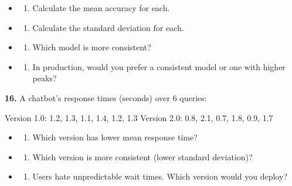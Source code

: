 \documentclass[
  11pt,
]{article}
\providecommand{\tightlist}{%
  \setlength{\itemsep}{0pt}\setlength{\parskip}{0pt}}
\begin{document}
\begin{itemize}
\item
  \begin{enumerate}
  \def\labelenumi{(\alph{enumi})}
  \tightlist
  \item
    Calculate the mean accuracy for each.
  \end{enumerate}
\item
  \begin{enumerate}
  \def\labelenumi{(\alph{enumi})}
  \setcounter{enumi}{1}
  \tightlist
  \item
    Calculate the standard deviation for each.
  \end{enumerate}
\item
  \begin{enumerate}
  \def\labelenumi{(\alph{enumi})}
  \setcounter{enumi}{2}
  \tightlist
  \item
    Which model is more consistent?
  \end{enumerate}
\item
  \begin{enumerate}
  \def\labelenumi{(\alph{enumi})}
  \setcounter{enumi}{3}
  \tightlist
  \item
    In production, would you prefer a consistent model or one with
    higher peaks?
  \end{enumerate}
\end{itemize}

\textbf{16.} A chatbot's response times (seconds) over 6 queries:

Version 1.0: 1.2, 1.3, 1.1, 1.4, 1.2, 1.3 Version 2.0: 0.8, 2.1, 0.7,
1.8, 0.9, 1.7

\begin{itemize}
\item
  \begin{enumerate}
  \def\labelenumi{(\alph{enumi})}
  \tightlist
  \item
    Which version has lower mean response time?
  \end{enumerate}
\item
  \begin{enumerate}
  \def\labelenumi{(\alph{enumi})}
  \setcounter{enumi}{1}
  \tightlist
  \item
    Which version is more consistent (lower standard deviation)?
  \end{enumerate}
\item
  \begin{enumerate}
  \def\labelenumi{(\alph{enumi})}
  \setcounter{enumi}{2}
  \tightlist
  \item
    Users hate unpredictable wait times. Which version would you deploy?
  \end{enumerate}
\end{itemize}
\end{document}
